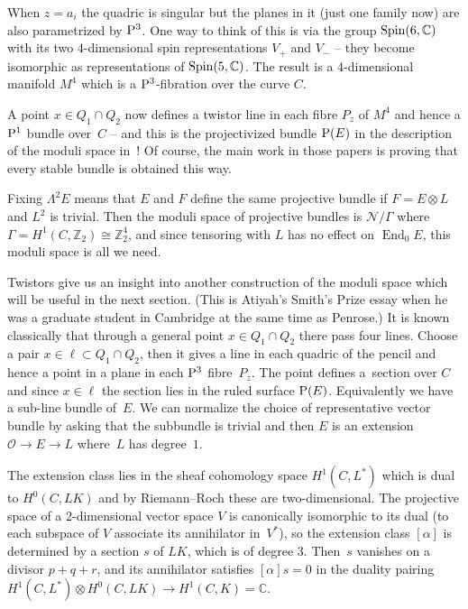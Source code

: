 \documentclass[10pt,a4paper]{amsart}
\numberwithin{equation}{section}
\begin{document}
When $z=a_i$ the quadric is singular but the planes in it (just one family now) are also parametrized by ${\rm P}^3$. One way to think of this is via the group ${\rm Spin}(6,{\mathbb C})$ with its two $4$-dimensional spin representations $V_+$ and $V_-$ -- they become isomorphic as representations of ${\rm Spin}(5,{\mathbb C})$. The result is a 4-dimensional manifold $M^4$ which is a ${\rm P}^3$-fibration over the curve $C$.

A point $x\in Q_1\cap Q_2$ now defines a twistor line in each fibre $P_z$ of $M^4$ and hence a ${\rm P}^1$ bundle over~$C$ -- and this is the projectivized bundle ${\rm P}(E)$ in the description of the moduli space in~\cite{Narasimhan/Ramanan1969, Newstead}! Of course, the main work in those papers is proving that every stable bundle is obtained this way.

Fixing $\Lambda^2E$ means that $E$ and $F$ define the same projective bundle if $F=E\otimes L$ and $L^2$ is trivial. Then the moduli space of projective bundles is ${\mathcal N}/\Gamma$ where $\Gamma = H^1(C,{\mathbb Z}_2)\cong {\mathbb Z}_2^4$, and since tensoring with $L$ has no effect on $\operatorname{End}_0E$, this moduli space is all we need.

Twistors give us an insight into another construction of the moduli space which will be useful in the next section. (This is Atiyah's Smith's Prize essay \cite{Atiyah} when he was a graduate student in Cambridge at the same time as Penrose.) It is known classically that through a general point $x\in Q_1\cap Q_2$ there pass four lines. Choose a pair $x\in \ell\subset Q_1\cap Q_2$, then it gives a line in each quadric of the pencil and hence a point in a plane in each ${\rm P}^3$ fibre~$P_z$. The point defines a~section over $C$ and since $x\in \ell$ the section lies in the ruled surface ${\rm P}(E)$. Equivalently we have a sub-line bundle of~$E$. We can normalize the choice of representative vector bundle by asking that the subbundle is trivial and then $E$ is an extension $\mathcal{O}\rightarrow E\rightarrow L$ where~$L$ has degree~$1$.

The extension class lies in the sheaf cohomology space $H^1(C, L^*)$ which is dual to $H^0(C, LK)$ and by Riemann--Roch these are two-dimensional. The projective space of a 2-dimensional vector space $V$ is canonically isomorphic to its dual (to each subspace of $V$ associate its annihilator in~$V^*$), so the extension class $[\alpha]$ is determined by a section $s$ of $LK$, which is of degree $3$. Then~$s$ vanishes on a divisor $p+q+r$, and its annihilator satisfies $[\alpha] s=0$ in the duality pairing $H^1(C,L^*)\otimes H^0(C,LK)\rightarrow H^1(C,K)={\mathbb C}$.
\end{document}
